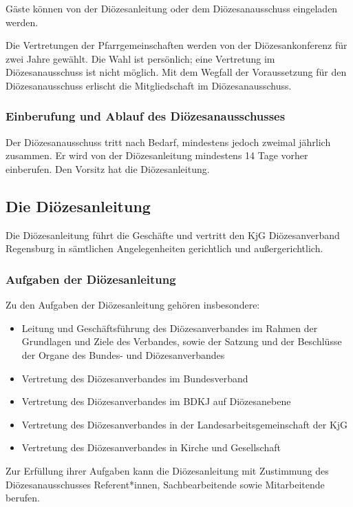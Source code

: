\documentclass[12pt]{report}
\begin{document}
\begin{flushleft}
Gäste können von der Diözesanleitung oder dem Diözesanausschuss eingeladen werden.

Die Vertretungen der Pfarrgemeinschaften werden von der Diözesankonferenz für zwei Jahre
gewählt. Die Wahl ist persönlich; eine Vertretung im Diözesanausschuss ist nicht möglich. Mit
dem Wegfall der Voraussetzung für den Diözesanausschuss erlischt die Mitgliedschaft im Diözesanausschuss.

\subsubsection{Einberufung und Ablauf des Diözesanausschusses}
Der Diözesanausschuss tritt nach Bedarf, mindestens jedoch zweimal jährlich zusammen. Er wird
von der Diözesanleitung mindestens 14 Tage vorher einberufen. Den Vorsitz hat die Diözesanleitung.

\subsection{Die Diözesanleitung}
Die Diözesanleitung führt die Geschäfte und vertritt den KjG Diözesanverband Regensburg in sämtlichen
Angelegenheiten gerichtlich und außergerichtlich.
\subsubsection{Aufgaben der Diözesanleitung}
Zu den Aufgaben der Diözesanleitung gehören insbesondere:
\begin{itemize}
  \item Leitung und Geschäftsführung des Diözesanverbandes im Rahmen der Grundlagen und Ziele
        des Verbandes, sowie der Satzung und der Beschlüsse der Organe des Bundes- und Diözesanverbandes
  \item Vertretung des Diözesanverbandes im Bundesverband
  \item Vertretung des Diözesanverbandes im BDKJ auf Diözesanebene
  \item Vertretung des Diözesanverbandes in der Landesarbeitsgemeinschaft der KjG
  \item Vertretung des Diözesanverbandes in Kirche und Gesellschaft
\end{itemize}

Zur Erfüllung ihrer Aufgaben kann die Diözesanleitung mit Zustimmung des Diözesanausschusses
Referent*innen, Sachbearbeitende sowie Mitarbeitende berufen.


\end{flushleft}
\end{document}
